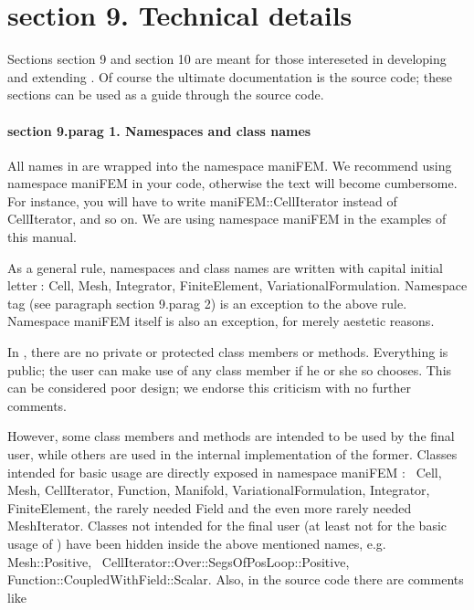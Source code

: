\section{\numb section 9. Technical details}

Sections \numb section 9 and \numb section 10 are meant for those intereseted in developing and
extending \maniFEM.
Of course the ultimate documentation is the source code; these sections can be used as
a guide through the source code.


\paragraph{\numb section 9.\numb parag 1. Namespaces and class names}

All names in {\maniFEM} are wrapped into the namespace {\codett maniFEM}.
We recommend {\codett using namespace maniFEM} in your code,
otherwise the text will become cumbersome.
For instance, you will have to write {\codett maniFEM::CellIterator} instead of
{\codett CellIterator}, and so on.
We are {\codett using namespace maniFEM} in the examples of this manual.

As a general rule, namespaces and class names are written with capital initial
letter$\;$:
{\codett Cell}, {\codett Mesh}, {\codett Integrator}, {\codett FiniteElement},
{\codett VariationalFormulation}.
Namespace {\codett tag} (see paragraph \numb section 9.\numb parag 2) is an exception
to the above rule.
Namespace {\codett maniFEM} itself is also an exception, for merely aestetic reasons.

In \maniFEM, there are no {\codett private} or {\codett protected} class members or methods.
Everything is {\codett public};
the user can make use of any class member if he or she so chooses.
This can be considered poor design; we endorse this criticism with no further comments.

However, some class members and methods are intended to be used by the final user,
while others are used in the internal implementation of the former.
Classes \hbox{intended} for basic usage are directly exposed in {\codett namespace maniFEM} :
\ {\codett Cell}, {\codett Mesh}, {\codett CellIterator}, \hbox{\codett Function},
{\codett Manifold}, {\codett VariationalFormulation}, {\codett Integrator},
{\codett FiniteElement}, the rarely needed {\codett Field} and the even more rarely needed
{\codett MeshIterator}.
Classes not intended for the final user (at least not for the basic usage of \maniFEM)
have been hidden inside the above mentioned names, e.g. {\codett Mesh::Positive},
\ {\codett CellIterator::Over::SegsOfPosLoop::Positive},
\hbox{\codett Function::CoupledWithField::Scalar}.
Also, in the source code there are comments like


